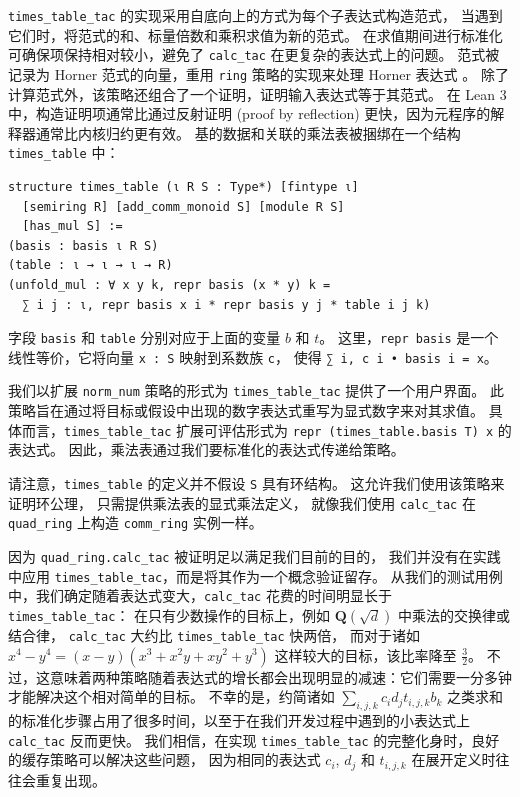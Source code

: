 \documentclass[sigplan,10pt,nonacm,
screen]{acmart} \settopmatter{printfolios=true,printccs=false,printacmref=false}
\newcommand{\QQ}{\mathbf{Q}}
\begin{document}
\lstinline{times_table_tac} 的实现采用自底向上的方式为每个子表达式构造范式，
当遇到它们时，将范式的和、标量倍数和乘积求值为新的范式。
在求值期间进行标准化可确保项保持相对较小，避免了 \lstinline{calc_tac} 在更复杂的表达式上的问题。
范式被记录为 Horner 范式的向量，重用 \lstinline{ring} 策略的实现来处理 Horner 表达式 \cite{ring-tactic}。
除了计算范式外，该策略还组合了一个证明，证明输入表达式等于其范式。
在 Lean 3 中，构造证明项通常比通过反射证明 (proof by reflection) 更快，因为元程序的解释器通常比内核归约更有效。
基的数据和关联的乘法表被捆绑在一个结构 \lstinline{times_table} 中：
\begin{lstlisting}
structure times_table (ι R S : Type*) [fintype ι]
  [semiring R] [add_comm_monoid S] [module R S]
  [has_mul S] :=
(basis : basis ι R S)
(table : ι → ι → ι → R)
(unfold_mul : ∀ x y k, repr basis (x * y) k =
  ∑ i j : ι, repr basis x i * repr basis y j * table i j k)
\end{lstlisting}
字段 \lstinline{basis} 和 \lstinline{table} 分别对应于上面的变量 $b$ 和 $t$。
这里，\lstinline{repr basis} 是一个线性等价，它将向量 \lstinline{x : S} 映射到系数族 \lstinline{c}，
使得 \lstinline{∑ i, c i • basis i = x}。

我们以扩展 \lstinline{norm_num} 策略的形式为 \lstinline{times_table_tac} 提供了一个用户界面。
此策略旨在通过将目标或假设中出现的数字表达式重写为显式数字来对其求值。
具\-体\-而\-言，\lstinline{times_table_tac} 扩展可评估形式为 \lstinline{repr (times_table.basis T) x} 的表达式。
因此，乘法表通过我们要标准化的表达式传递给策略。

请注意，\lstinline{times_table} 的定义并不假设 \lstinline{S} 具有环结构。
这允许我们使用该策略来证明环公理，
只需提供乘法表的显式乘法定义，
就像我们使用 \lstinline{calc_tac} 在 \lstinline{quad_ring} 上构造 \lstinline{comm_ring} 实例一样。

因为 \lstinline{quad_ring.calc_tac} 被证明足以满足我们目前的目的，
我们并没有在实践中应用 \lstinline{times_table_tac}，而是将其作为一个概念验证留存。
从我们的测试用例中，我们确定随着表达式变大，\lstinline{calc_tac} 花费的时间明显长于 \lstinline{times_table_tac}：
在只有少数操作的目标上，例如 $\QQ(\sqrt{d})$ 中乘法的交换律或结合律，
\lstinline{calc_tac} 大约比 \lstinline{times_table_tac} 快两倍，
而对于诸如 $x^4 - y^4 = (x - y) (x^3 + x^2 y + x y^2 + y^3)$ 这样较大的目标，该比率降至 $\frac{3}{2}$。
不过，这意味着两种策略随着表达式的增长都会出现明显的减速：它们需要一分多钟才能解决这个相对简单的目标。
不幸的是，约简诸如 $\sum_{i, j, k} c_i d_j t_{i, j, k} b_k$ 之类求和的标准化步骤占用了很多时间，以至于在我们开发过程中遇到的小表达式上 \lstinline{calc_tac} 反而更快。
我们相信，在实现 \lstinline{times_table_tac} 的完整化身时，良好的缓存策略可以解决这些问题，
因为相同的表达式 $c_i$, $d_j$ 和 $t_{i, j, k}$ 在展开定义时往往会重复出现。
\end{document}
